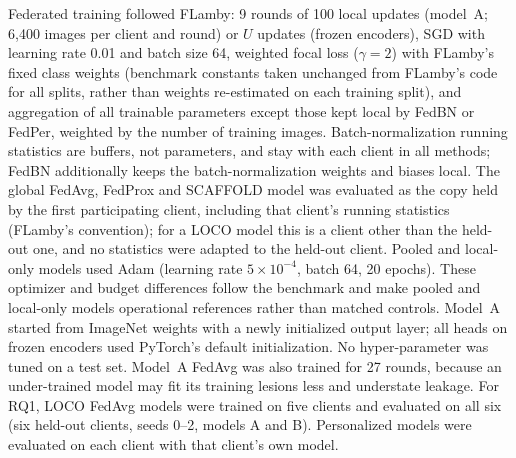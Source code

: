 Federated training followed FLamby: 9 rounds of 100 local updates (model~A; 6,400 images per client and
round) or $U$ updates (frozen encoders), SGD with learning rate 0.01 and batch size 64, weighted focal loss
\cite{lin2017focal} ($\gamma=2$) with FLamby's fixed class weights (benchmark constants taken unchanged from FLamby's code for all splits, rather than weights re-estimated on each training split), and aggregation of all trainable parameters except those kept local by FedBN or FedPer, weighted by the number of training images.
Batch-normalization running statistics are buffers, not parameters, and stay with each client in all
methods; FedBN additionally keeps the batch-normalization weights and biases local. The global FedAvg,
FedProx and SCAFFOLD model was evaluated as the copy held by the first participating client, including
that client's running statistics (FLamby's convention); for a LOCO model this is a client other than the
held-out one, and no statistics were adapted to the held-out client. Pooled and local-only models used
Adam \cite{kingma2015adam} (learning rate $5\times10^{-4}$, batch 64, 20 epochs). These optimizer and
budget differences follow the benchmark and make pooled and local-only models operational references
rather than matched controls. Model~A started from ImageNet weights with a newly initialized output layer;
all heads on frozen encoders used PyTorch's default initialization. No hyper-parameter was tuned on a test
set. Model~A FedAvg was also trained for 27 rounds, because an under-trained model may fit its training
lesions less and understate leakage. For RQ1, LOCO FedAvg models were trained on five clients and
evaluated on all six (six held-out clients, seeds 0--2, models A and B). Personalized models were
evaluated on each client with that client's own model.

